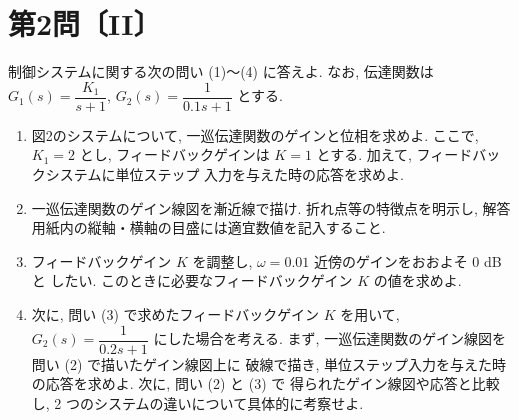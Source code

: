 
\section*{第2問〔II〕}

制御システムに関する次の問い (1)〜(4) に答えよ. なお, 伝達関数は $G_1(s)=\dfrac{K_1}{s+1}$,
$G_2(s)=\dfrac{1}{0.1s+1}$ とする.

\begin{center}
\end{center}

\begin{enumerate}[label=(\arabic*)]
  \item 図2のシステムについて, 一巡伝達関数のゲインと位相を求めよ. ここで, $K_1=2$ とし,
        フィードバックゲインは $K=1$ とする. 加えて, フィードバックシステムに単位ステップ
        入力を与えた時の応答を求めよ.

  \item 一巡伝達関数のゲイン線図を漸近線で描け. 折れ点等の特徴点を明示し,
        解答用紙内の縦軸・横軸の目盛には適宜数値を記入すること.

  \item フィードバックゲイン $K$ を調整し, $\omega=0.01$ 近傍のゲインをおおよそ $0$ dB と
        したい. このときに必要なフィードバックゲイン $K$ の値を求めよ.

  \item 次に, 問い (3) で求めたフィードバックゲイン $K$ を用いて, $G_2(s)=\dfrac{1}{0.2s+1}$
        にした場合を考える. まず, 一巡伝達関数のゲイン線図を問い (2) で描いたゲイン線図上に
        破線で描き, 単位ステップ入力を与えた時の応答を求めよ. 次に, 問い (2) と (3) で
        得られたゲイン線図や応答と比較し, 2 つのシステムの違いについて具体的に考察せよ.
\end{enumerate}
